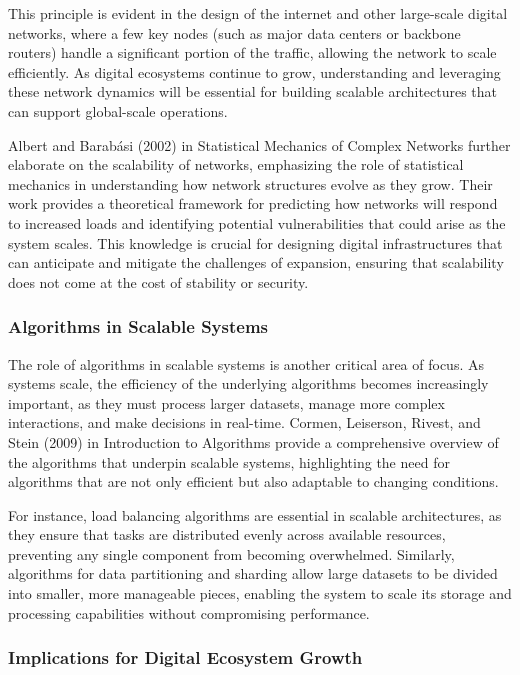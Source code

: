 \documentclass[12pt,twoside]{article}
\begin{document}
This principle is evident in the design of the internet and other large-scale digital networks, where a few key nodes (such as major data centers or backbone routers) handle a significant portion of the traffic, allowing the network to scale efficiently. As digital ecosystems continue to grow, understanding and leveraging these network dynamics will be essential for building scalable architectures that can support global-scale operations.

Albert and Barabási (2002) in Statistical Mechanics of Complex Networks further elaborate on the scalability of networks, emphasizing the role of statistical mechanics in understanding how network structures evolve as they grow. Their work provides a theoretical framework for predicting how networks will respond to increased loads and identifying potential vulnerabilities that could arise as the system scales. This knowledge is crucial for designing digital infrastructures that can anticipate and mitigate the challenges of expansion, ensuring that scalability does not come at the cost of stability or security.


\subsubsection{Algorithms in Scalable Systems}

The role of algorithms in scalable systems is another critical area of focus. As systems scale, the efficiency of the underlying algorithms becomes increasingly important, as they must process larger datasets, manage more complex interactions, and make decisions in real-time. Cormen, Leiserson, Rivest, and Stein (2009) in Introduction to Algorithms provide a comprehensive overview of the algorithms that underpin scalable systems, highlighting the need for algorithms that are not only efficient but also adaptable to changing conditions.

For instance, load balancing algorithms are essential in scalable architectures, as they ensure that tasks are distributed evenly across available resources, preventing any single component from becoming overwhelmed. Similarly, algorithms for data partitioning and sharding allow large datasets to be divided into smaller, more manageable pieces, enabling the system to scale its storage and processing capabilities without compromising performance.


\subsubsection{Implications for Digital Ecosystem Growth}
\end{document}
